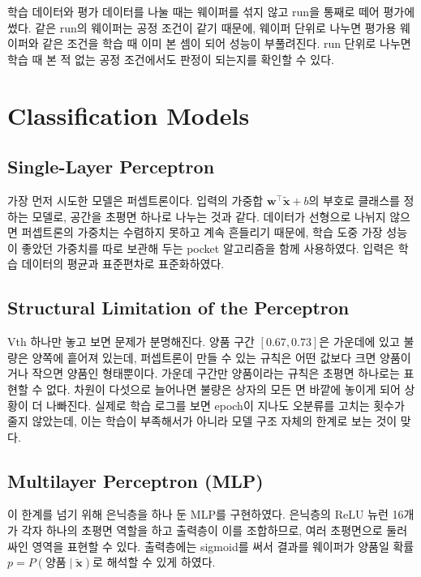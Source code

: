 \documentclass[10pt,twocolumn,a4paper]{article}
\begin{document}
학습 데이터와 평가 데이터를 나눌 때는 웨이퍼를 섞지 않고 run을 통째로 떼어 평가에 썼다. 같은
run의 웨이퍼는 공정 조건이 같기 때문에, 웨이퍼 단위로 나누면 평가용 웨이퍼와 같은 조건을 학습
때 이미 본 셈이 되어 성능이 부풀려진다. run 단위로 나누면 학습 때 본 적 없는 공정 조건에서도
판정이 되는지를 확인할 수 있다.

\section{Classification Models}

\subsection{Single-Layer Perceptron}

가장 먼저 시도한 모델은 퍼셉트론\cite{rosenblatt}이다. 입력의 가중합
$\bm{w}^\top\tilde{\bm{x}} + b$의 부호로 클래스를 정하는 모델로, 공간을 초평면 하나로 나누는
것과 같다. 데이터가 선형으로 나뉘지 않으면 퍼셉트론의 가중치는 수렴하지 못하고 계속 흔들리기
때문에, 학습 도중 가장 성능이 좋았던 가중치를 따로 보관해 두는 pocket 알고리즘\cite{gallant}을
함께 사용하였다. 입력은 학습 데이터의 평균과 표준편차로 표준화하였다.

\subsection{Structural Limitation of the Perceptron}\label{sec:limit}

Vth 하나만 놓고 보면 문제가 분명해진다. 양품 구간 $[0.67, 0.73]$은 가운데에 있고 불량은
양쪽에 흩어져 있는데, 퍼셉트론이 만들 수 있는 규칙은 어떤 값보다 크면 양품이거나 작으면 양품인
형태뿐이다. 가운데 구간만 양품이라는 규칙은 초평면 하나로는 표현할 수 없다\cite{minsky}.
차원이 다섯으로 늘어나면 불량은 상자의 모든 면 바깥에 놓이게 되어 상황이 더 나빠진다.
실제로 학습 로그를 보면 epoch이 지나도 오분류를 고치는 횟수가 줄지 않았는데, 이는 학습이
부족해서가 아니라 모델 구조 자체의 한계로 보는 것이 맞다.

\subsection{Multilayer Perceptron (MLP)}

이 한계를 넘기 위해 은닉층을 하나 둔 MLP를 구현하였다. 은닉층의 ReLU 뉴런 16개가 각자 하나의
초평면 역할을 하고 출력층이 이를 조합하므로, 여러 초평면으로 둘러싸인 영역을 표현할 수 있다.
출력층에는 sigmoid를 써서 결과를 웨이퍼가 양품일 확률
$p = P(\text{양품}\mid\tilde{\bm{x}})$로 해석할 수 있게 하였다.
\end{document}

